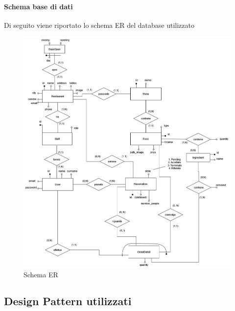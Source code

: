 \paragraph{Schema base di dati}
Di seguito viene riportato lo schema ER del database utilizzato
\begin{figure}[H]
    \centering
    \includegraphics[width=0.85\linewidth]{images/ER.png}
    \caption{Schema ER}
    \label{fig:schemaER}
\end{figure}
\subsection{Design Pattern utilizzati}
